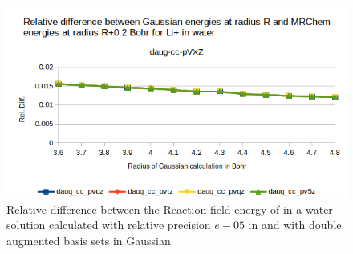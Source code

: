 \documentclass[../master_thesis.tex]{subfiles}
\begin{document}
\begin{figure}[!htb]
  \centering
    \includegraphics[width=\linewidth]{img/lipdaugreldiff02.png}
  \caption{Relative difference between the Reaction field energy of  in a water solution calculated with relative precision $e-05$ in \mrchem
  and with double augmented basis sets in Gaussian}
  \label{fig:lipreldiff02daug}
\end{figure}
\end{document}
